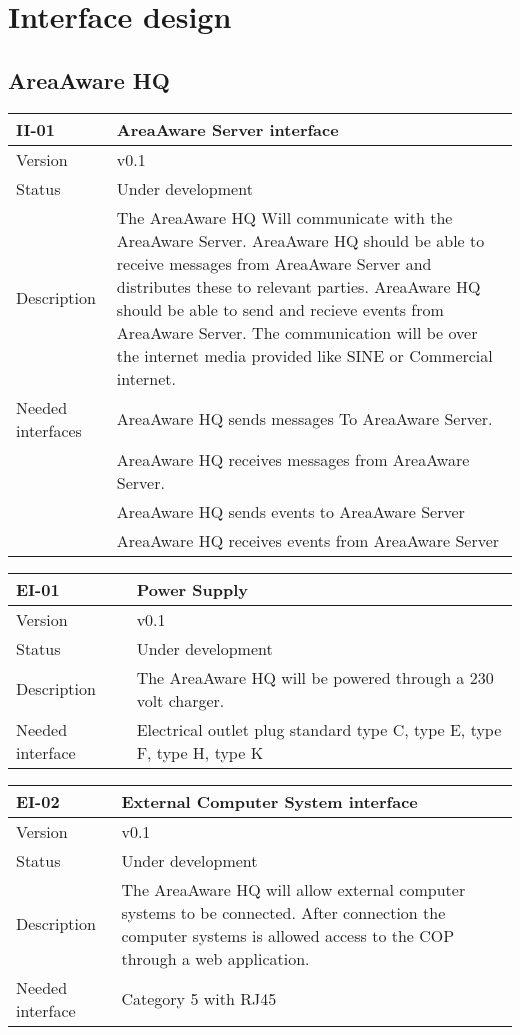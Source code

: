 \chapter{Interface design}
\label{chp_interfaceDesign}

\section{AreaAware HQ}
\label{sec:areaAwarehq}

\begin{longtable}{| p{3.5cm} |  p{10cm} | }
	\hline
	\textbf{II-01} &  \textbf{AreaAware Server interface } \\
	\hline
	Version & v0.1 \\
	\hline
	Status & Under development \\
	\hline
	Description & The AreaAware HQ Will communicate with the AreaAware Server. AreaAware HQ should be able to receive messages from AreaAware Server and distributes these to relevant parties. AreaAware HQ should be able to send and recieve events from AreaAware Server. The communication will be over the internet media provided like SINE or Commercial internet. \\
	\hline
	 Needed interfaces & AreaAware HQ sends messages To AreaAware Server.  \\
				& AreaAware HQ receives messages from AreaAware Server. \\
				& AreaAware HQ sends events to AreaAware Server  \\
				& AreaAware HQ receives events from AreaAware Server  \\
	\hline
\end{longtable}

\begin{longtable}{| p{3.5cm} |  p{10cm} | }
	\hline
	\textbf{EI-01} &  \textbf{Power Supply} \\
	\hline
	Version & v0.1 \\
	\hline
	Status & Under development \\
	\hline
	Description & The AreaAware HQ will be powered through a 230 volt charger.	\\
	\hline
	Needed interface &  Electrical outlet plug standard type C, type E,  type F,  type H, type K \\
	\hline
\end{longtable}

\begin{longtable}{| p{3.5cm} |  p{10cm} | }
	\hline
	\textbf{EI-02} &  \textbf{External Computer System interface} \\
	\hline
	Version & v0.1 \\
	\hline
	Status & Under development \\
	\hline
	Description & The AreaAware HQ will allow external computer systems to be connected. After connection the computer systems is allowed access to the COP through a web application.	\\
	\hline
	Needed interface & Category 5 with RJ45 \\
	\hline
\end{longtable}

